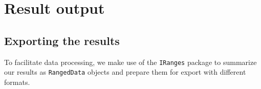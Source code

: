 \documentclass[11pt]{article}
\begin{document}
%
%
%
%
%

\section{Result output}

\subsection{Exporting the results}
To facilitate data processing, we make use of the \texttt{IRanges} package to
summarize our results as \texttt{RangedData} objects and prepare them for
export with different formats.
\end{document}
